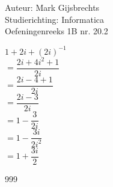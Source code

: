 \documentclass[a4paper]{article}
\begin{document}
\noindent \large Auteur: Mark Gijsbrechts \\
\noindent \large Studierichting: Informatica\\
\noindent \large Oefeningenreeks 1B nr. 20.2\\

\medskip

\normalsize



$1 + 2i + (2i)^{-1}$ \\

$=\dfrac{2i + 4i^2 + 1}{2i}$ \\

$=\dfrac{2i -4 + 1}{2i}$ \\

$=\dfrac{2i -3}{2i}$ \\

$=1 - \dfrac{3}{2i}$ \\

$=1 - \dfrac{3i}{2i^2}$ \\

$=1 + \dfrac{3i}{2}$ \\

\begin{thebibliography}{999}
\end{thebibliography}
\end{document}
